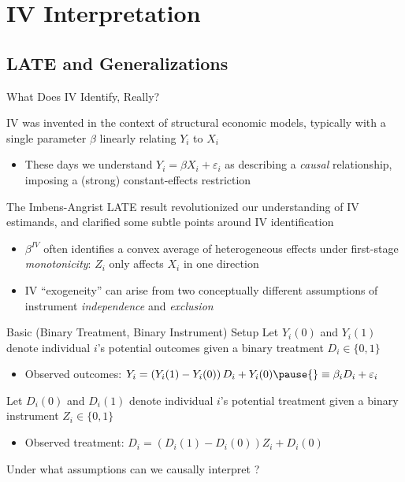 \documentclass{beamer}
\begin{document}
\section{IV Interpretation}

\subsection{LATE and Generalizations}

\begin{frame}{What Does IV Identify, Really?}

IV was invented in the context of structural economic models, typically with a single parameter $\beta$ linearly relating $Y_i$ to $X_i$ 
\begin{itemize}
\item These days we understand $Y_i=\beta X_i+\varepsilon_i$ as describing a \emph{causal} relationship, imposing a (strong) constant-effects restriction
\end{itemize} \pause{}\medskip

The Imbens-Angrist LATE result revolutionized our understanding of IV estimands, and clarified some subtle points around IV identification
\begin{itemize}
\item $\beta^{IV}$ often identifies a convex average of heterogeneous effects under first-stage \emph{monotonicity}: $Z_i$ only affects $X_i$ in one direction
\item IV ``exogeneity'' can arise from two conceptually different assumptions of instrument \emph{independence} and \emph{exclusion}
\end{itemize}
\end{frame}

\begin{frame}{Basic (Binary Treatment, Binary Instrument) Setup}
Let $Y_i(0)$ and $Y_i(1)$ denote individual $i$'s potential outcomes given a binary treatment $D_i\in\{0,1\}$\smallskip
\begin{itemize}
\item Observed outcomes: $Y_i=\left(Y_i(1)-Y_i(0)\right)D_i+Y_i(0)\pause{}\equiv\beta_i D_i+\varepsilon_i$
\end{itemize}\medskip\pause{}
Let $D_i(0)$ and $D_i(1)$ denote individual $i$'s potential treatment given a binary instrument $Z_i\in\{0,1\}$\smallskip
\begin{itemize}
\item Observed treatment: $D_i=\left(D_i(1)-D_i(0)\right)Z_i+D_i(0)$
\end{itemize}\medskip\pause{}
Under what assumptions can we causally interpret ?
\end{frame}
\end{document}
